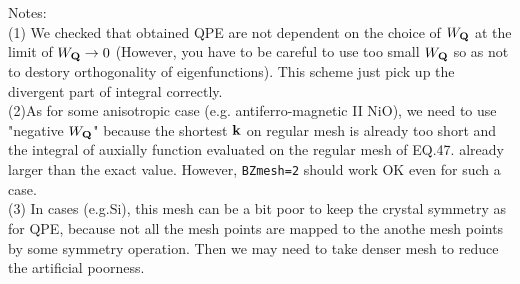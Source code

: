 \documentclass[a4paper,10pt,epsf,fleqn]{article}
\newcommand{\bfk}{{\bf k}}
\newcommand{\bfQ}{{\bf Q}}
\begin{document}
\noindent Notes:\\ 
(1) We checked that obtained QPE are not dependent
on the choice of $W_\bfQ$ at the limit of $W_\bfQ \to 0$
(However, you have to be careful to use too small $W_\bfQ$
so as not to destory orthogonality of eigenfunctions).
This scheme just pick up the divergent part of 
integral correctly.\\
(2)As for some anisotropic case (e.g. antiferro-magnetic II NiO),
we need to use "negative $W_\bfQ$" because the shortest $\bfk$ on regular mesh
is already too short and the integral of auxially function evaluated
on the regular mesh of EQ.47. already larger 
than the exact value. However, {\tt BZmesh=2} should work OK 
even for such a case.\\
(3) In cases (e.g.Si), this mesh can be a bit poor
to keep the crystal symmetry as for QPE, because not all the mesh points are 
mapped to the anothe mesh points by some symmetry operation.
Then we may need to take denser mesh to reduce the artificial poorness.
\end{document}
